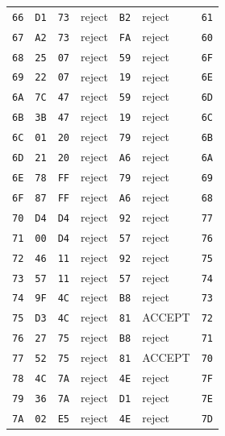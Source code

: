 \begin{longtable}{lllllll}
\texttt{66} & \texttt{D1} & \texttt{73} & reject & \texttt{B2} & reject & \texttt{61}\\
\texttt{67} & \texttt{A2} & \texttt{73} & reject & \texttt{FA} & reject & \texttt{60}\\
\texttt{68} & \texttt{25} & \texttt{07} & reject & \texttt{59} & reject & \texttt{6F}\\
\texttt{69} & \texttt{22} & \texttt{07} & reject & \texttt{19} & reject & \texttt{6E}\\
\texttt{6A} & \texttt{7C} & \texttt{47} & reject & \texttt{59} & reject & \texttt{6D}\\
\texttt{6B} & \texttt{3B} & \texttt{47} & reject & \texttt{19} & reject & \texttt{6C}\\
\texttt{6C} & \texttt{01} & \texttt{20} & reject & \texttt{79} & reject & \texttt{6B}\\
\texttt{6D} & \texttt{21} & \texttt{20} & reject & \texttt{A6} & reject & \texttt{6A}\\
\texttt{6E} & \texttt{78} & \texttt{FF} & reject & \texttt{79} & reject & \texttt{69}\\
\texttt{6F} & \texttt{87} & \texttt{FF} & reject & \texttt{A6} & reject & \texttt{68}\\
\texttt{70} & \texttt{D4} & \texttt{D4} & reject & \texttt{92} & reject & \texttt{77}\\
\texttt{71} & \texttt{00} & \texttt{D4} & reject & \texttt{57} & reject & \texttt{76}\\
\texttt{72} & \texttt{46} & \texttt{11} & reject & \texttt{92} & reject & \texttt{75}\\
\texttt{73} & \texttt{57} & \texttt{11} & reject & \texttt{57} & reject & \texttt{74}\\
\texttt{74} & \texttt{9F} & \texttt{4C} & reject & \texttt{B8} & reject & \texttt{73}\\
\texttt{75} & \texttt{D3} & \texttt{4C} & reject & \texttt{81} & ACCEPT & \texttt{72}\\
\texttt{76} & \texttt{27} & \texttt{75} & reject & \texttt{B8} & reject & \texttt{71}\\
\texttt{77} & \texttt{52} & \texttt{75} & reject & \texttt{81} & ACCEPT & \texttt{70}\\
\texttt{78} & \texttt{4C} & \texttt{7A} & reject & \texttt{4E} & reject & \texttt{7F}\\
\texttt{79} & \texttt{36} & \texttt{7A} & reject & \texttt{D1} & reject & \texttt{7E}\\
\texttt{7A} & \texttt{02} & \texttt{E5} & reject & \texttt{4E} & reject & \texttt{7D}\\

\end{longtable}
